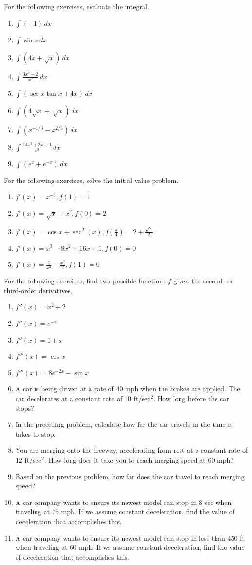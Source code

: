 \documentclass{exercises}
\begin{document}
For the following exercises, evaluate the integral.

\begin{enumerate}[resume]
\item $\int(-1)\,dx$
\item $\int \sin x\,dx$
\item $\int(4x+\sqrt{x})\,dx$
\item $\int \frac{3x^{2}+2}{x^{2}}\,dx$
\item $\int(\sec x\tan x+4x)\,dx$
\item $\int(4\sqrt{x}+\sqrt[4]{x})\,dx$
\item $\int(x^{-1/3}-x^{2/3})\,dx$
\item $\int \frac{14x^{3}+2x+1}{x^{3}}\,dx$
\item $\int(e^{x}+e^{-x})\,dx$
\end{enumerate}

For the following exercises, solve the initial value problem.

\begin{enumerate}[resume]
\item $f'(x)=x^{-3},f(1)=1$
\item $f'(x)=\sqrt{x}+x^{2},f(0)=2$
\item $f'(x)=\cos x+\sec^{2}(x),f(\frac{\pi}{4})=2+\frac{\sqrt{2}}{2}$
\item $f'(x)=x^{3}-8x^{2}+16x+1,f(0)=0$
\item $f'(x)=\frac{2}{x^{2}}-\frac{x^{2}}{2},f(1)=0$
\end{enumerate}

For the following exercises, find two possible functions $f$ given the second- or third-order derivatives.

\begin{enumerate}[resume]
\item $f''(x)=x^{2}+2$
\item $f''(x)=e^{-x}$
\item $f''(x)=1+x$
\item $f'''(x)=\cos x$
\item $f'''(x)=8e^{-2x}-\sin x$
\item A car is being driven at a rate of $40$ mph when the brakes are applied. The car decelerates at a constant rate of $10$ ft/sec$^{2}$. How long before the car stops?
\item In the preceding problem, calculate how far the car travels in the time it takes to stop.
\item You are merging onto the freeway, accelerating from rest at a constant rate of $12$ ft/sec$^{2}$. How long does it take you to reach merging speed at $60$ mph?
\item Based on the previous problem, how far does the car travel to reach merging speed?
\item A car company wants to ensure its newest model can stop in $8$ sec when traveling at $75$ mph. If we assume constant deceleration, find the value of deceleration that accomplishes this.
\item A car company wants to ensure its newest model can stop in less than $450$ ft when traveling at $60$ mph. If we assume constant deceleration, find the value of deceleration that accomplishes this.
\end{enumerate}
\end{document}
